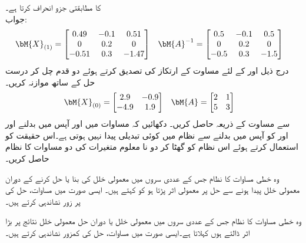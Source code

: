   کا مطابقتی جزو   انحراف کرتا ہے۔\\
جواب:
\begin{align*}
\bM{X}_{(1)}&=
\begin{bmatrix} 0.49&-0.1&0.51\\0&0.2&0\\-0.51&0.3&-1.47 \end{bmatrix} &
\bM{A}^{-1}&=\begin{bmatrix} 0.5&-0.1&0.5\\ 0&0.2&0\\ -0.5&0.3&-1.5 \end{bmatrix}
\end{align*}
\quad
درج ذیل  اور   کے لئے مساوت  کے ارتکاز کی تصدیق کرتے ہوئے  دو قدم چل کر درست حل کے ساتھ موازنہ کریں۔
\begin{align*}
\bM{X}_{(0)}&=\begin{bmatrix} 2.9& -0.9\\-4.9&1.9 \end{bmatrix} &
\bM{A}&=\begin{bmatrix} 2&1\\ 5&3 \end{bmatrix}
\end{align*}
\quad
{} سے مساوت  کے ذریعہ  حاصل کریں۔
\quad
دکھائیں کہ مساوات  میں  اور  آپس میں بدلنے اور  اور  کو آپس میں بدلنے سے نظام میں کوئی تبدیلی پیدا نہیں ہوتی ہے۔اس حقیقت کو استعمال کرتے ہوئے اس نظام کو گھٹا کر دو نا معلوم متغیرات کی دو مساوات کا نظام حاصل کریں۔

وہ خطی مساوات کا نظام جس کے عددی سروں میں معمولی خلل کی بنا یا حل کرنے کے دوران معمولی خلل پیدا ہونے سے حل پر معمولی اثر پڑتا ہو کو  کہتے ہیں۔ ایسی صورت میں مساوات، حل کی پر زور نشاندہی کرتے ہیں۔

وہ خطی مساوات کا نظام جس کے عددی سروں میں معمولی خلل یا دوران حل معمولی خلل نتائج پر بڑا اثر ڈالتے ہوں  کہلاتا ہے۔ایسی صورت میں مساوات، حل کی کمزور نشاندہی کرتے ہیں۔

